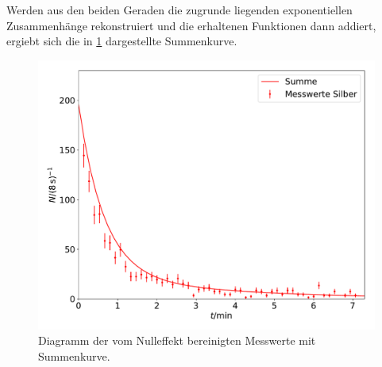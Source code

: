 Werden aus den beiden Geraden die zugrunde liegenden exponentiellen Zusammenhänge
rekonstruiert und die erhaltenen Funktionen dann addiert, ergiebt sich die in \ref{fig:7} dargestellte
Summenkurve.
\begin{figure}
\centering
  \includegraphics[width=\textwidth]{2Silber.pdf}
  \caption{Diagramm der vom Nulleffekt bereinigten Messwerte mit Summenkurve.}
  \label{fig:7}
\end{figure}
